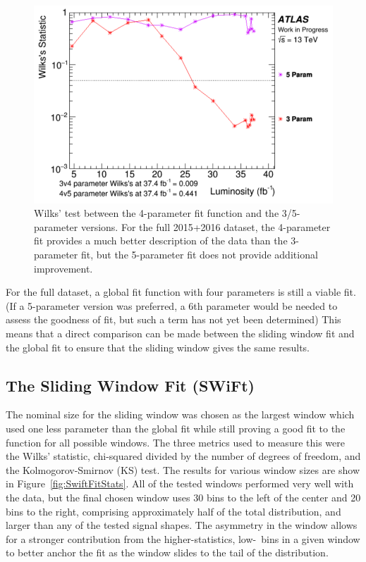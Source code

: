 \begin{figure}[h!]
	\centering
	\includegraphics[width=0.75\columnwidth]{figures/SearchStrategy/Wilks.png}
	\caption{Wilks' test between the 4-parameter fit function and the 3/5-parameter versions.  For the full 2015+2016 dataset, the 4-parameter fit provides a much better description of the data than the 3-parameter fit, but the 5-parameter fit does not provide additional improvement.}
	\label{fig:Wilks}
\end{figure}

For the full dataset, a global fit function with four parameters is still a viable fit.  (If a 5-parameter version was preferred, a 6th parameter would be needed to assess the goodness of fit, but such a term has not yet been determined)  This means that a direct comparison can be made between the sliding window fit and the global fit to ensure that the sliding window gives the same results.

\subsection{The Sliding Window Fit (SWiFt)}

The nominal size for the sliding window was chosen as the largest window which used one less parameter than the global fit while still proving a good fit to the function for all possible windows.  The three metrics used to measure this were the Wilks' statistic, chi-squared divided by the number of degrees of freedom, and the Kolmogorov-Smirnov (KS) test.  The results for various window sizes are show in Figure~\ref{fig:SwiftFitStats}.  All of the tested windows performed very well with the data, but the final chosen window uses 30 bins to the left of the center and 20 bins to the right, comprising approximately half of the total distribution, and larger than any of the tested signal shapes.  The asymmetry in the window allows for a stronger contribution from the higher-statistics, low-\mjj~bins in a given window to better anchor the fit as the window slides to the tail of the distribution.

